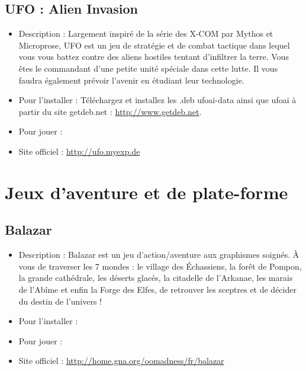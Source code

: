 \subsection{UFO : Alien Invasion}
\begin{itemize}
\begingroup
{}
\item Description : Largement inspiré de la série des X-COM par Mythos et Microprose, UFO est un jeu de stratégie et de combat tactique dans lequel vous vous battez contre des aliens hostiles tentant d'infiltrer la terre. Vous êtes le commandant d'une petite unité spéciale dans cette lutte. Il vous faudra également prévoir l'avenir en étudiant leur technologie.{\par}
\endgroup
\item Pour l'installer : Téléchargez et installez les .deb ufoai-data ainsi que ufoai à partir du site getdeb.net :
\url{http://www.getdeb.net}.{\par}
\item Pour jouer : 
\item Site officiel : \url{http://ufo.myexp.de}{\par}
\end{itemize}
\section{Jeux d'aventure et de plate-forme}
\subsection{Balazar}
\begin{itemize}
\begingroup
{}
\item Description : Balazar est un jeu d'action/aventure aux graphismes soignés. À vous de traverser les 7 mondes : le village des Échassiens, la forêt de Pompon, la grande cathédrale, les déserts glacés, la citadelle de l'Arkanae, les marais de l'Abîme et enfin la Forge des Elfes, de retrouver les sceptres et de décider du destin de l'univers !{\par}
\endgroup
\item Pour l'installer : 
\item Pour jouer : 
\item Site officiel : \url{http://home.gna.org/oomadness/fr/balazar}{\par}
\end{itemize}
